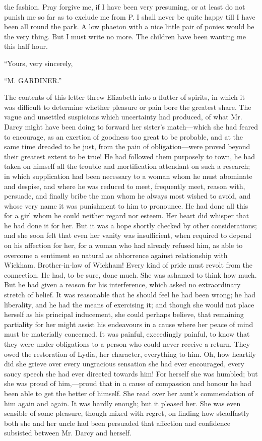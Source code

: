 the fashion. Pray forgive me, if I have been very presuming, or at least do not punish me so far as to exclude me from P. I shall never be quite happy till I have been all round the park. A low phaeton with a nice little pair of ponies would be the very thing. But I must write no more. The children have been wanting me this half hour.

``Yours, very sincerely,

``M. GARDINER.''

The contents of this letter threw Elizabeth into a flutter of spirits, in which it was difficult to determine whether pleasure or pain bore the greatest share. The vague and unsettled suspicions which uncertainty had produced, of what Mr. Darcy might have been doing to forward her sister's match---which she had feared to encourage, as an exertion of goodness too great to be probable, and at the same time dreaded to be just, from the pain of obligation---were proved beyond their greatest extent to be true! He had followed them purposely to town, he had taken on himself all the trouble and mortification attendant on such a research; in which supplication had been necessary to a woman whom he must abominate and despise, and where he was reduced to meet, frequently meet, reason with, persuade, and finally bribe the man whom he always most wished to avoid, and whose very name it was punishment to him to pronounce. He had done all this for a girl whom he could neither regard nor esteem. Her heart did whisper that he had done it for her. But it was a hope shortly checked by other considerations; and she soon felt that even her vanity was insufficient, when required to depend on his affection for her, for a woman who had already refused him, as able to overcome a sentiment so natural as abhorrence against relationship with Wickham. Brother-in-law of Wickham! Every kind of pride must revolt from the connection. He had, to be sure, done much. She was ashamed to think how much. But he had given a reason for his interference, which asked no extraordinary stretch of belief. It was reasonable that he should feel he had been wrong; he had liberality, and he had the means of exercising it; and though she would not place herself as his principal inducement, she could perhaps believe, that remaining partiality for her might assist his endeavours in a cause where her peace of mind must be materially concerned. It was painful, exceedingly painful, to know that they were under obligations to a person who could never receive a return. They owed the restoration of Lydia, her character, everything to him. Oh, how heartily did she grieve over every ungracious sensation she had ever encouraged, every saucy speech she had ever directed towards him! For herself she was humbled; but she was proud of him,---proud that in a cause of compassion and honour he had been able to get the better of himself. She read over her aunt's commendation of him again and again. It was hardly enough; but it pleased her. She was even sensible of some pleasure, though mixed with regret, on finding how steadfastly both she and her uncle had been persuaded that affection and confidence subsisted between Mr. Darcy and herself.


